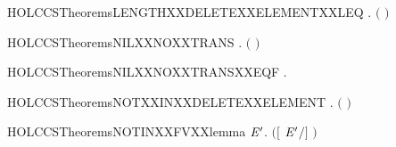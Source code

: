 \newcommand{\HOLCCSTheoremsLENGTHXXDELETEXXELEMENTXXLE}{\UseVerbatim{HOLCCSTheoremsLENGTHXXDELETEXXELEMENTXXLE}}
\begin{SaveVerbatim}{HOLCCSTheoremsLENGTHXXDELETEXXELEMENTXXLEQ}
\HOLTokenTurnstile{} \HOLSymConst{\HOLTokenForall{}} .  \ensuremath{(}  \ensuremath{)} \HOLSymConst{\HOLTokenLeq{}}  
\end{SaveVerbatim}
\newcommand{\HOLCCSTheoremsLENGTHXXDELETEXXELEMENTXXLEQ}{\UseVerbatim{HOLCCSTheoremsLENGTHXXDELETEXXELEMENTXXLEQ}}
\begin{SaveVerbatim}{HOLCCSTheoremsNILXXNOXXTRANS}
\HOLTokenTurnstile{} \HOLSymConst{\HOLTokenForall{}} . \HOLSymConst{\HOLTokenNeg{}}\ensuremath{(} \HOLTokenTransBegin{}\HOLTokenTransEnd {}\ensuremath{)}
\end{SaveVerbatim}
\newcommand{\HOLCCSTheoremsNILXXNOXXTRANS}{\UseVerbatim{HOLCCSTheoremsNILXXNOXXTRANS}}
\begin{SaveVerbatim}{HOLCCSTheoremsNILXXNOXXTRANSXXEQF}
\HOLTokenTurnstile{} \HOLSymConst{\HOLTokenForall{}} .  \HOLTokenTransBegin{}\HOLTokenTransEnd {} \HOLSymConst{\HOLTokenEquiv{}} 
\end{SaveVerbatim}
\newcommand{\HOLCCSTheoremsNILXXNOXXTRANSXXEQF}{\UseVerbatim{HOLCCSTheoremsNILXXNOXXTRANSXXEQF}}
\begin{SaveVerbatim}{HOLCCSTheoremsNOTXXINXXDELETEXXELEMENT}
\HOLTokenTurnstile{} \HOLSymConst{\HOLTokenForall{}} . \HOLSymConst{\HOLTokenNeg{}}  \ensuremath{(}  \ensuremath{)}
\end{SaveVerbatim}
\newcommand{\HOLCCSTheoremsNOTXXINXXDELETEXXELEMENT}{\UseVerbatim{HOLCCSTheoremsNOTXXINXXDELETEXXELEMENT}}
\begin{SaveVerbatim}{HOLCCSTheoremsNOTINXXFVXXlemma}
\HOLTokenTurnstile{} \HOLSymConst{\HOLTokenForall{}}  \ensuremath{\HOLBoundVar{E}\sp{\prime{}}}.  \HOLConst{\HOLTokenNotIn{}}  \ensuremath{(}\ensuremath{[}  \ensuremath{\HOLBoundVar{E}\sp{\prime{}}}\ensuremath{/}\ensuremath{]} \ensuremath{)}
\end{SaveVerbatim}
